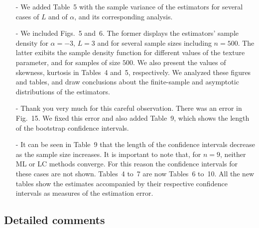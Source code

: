 \documentclass{ar2rc}
\begin{document}
	\begin{itemize}
		\item [-] We added Table~5 with the sample variance of the estimators for several cases of $L$ and of $\alpha$, and its corresponding analysis.
		
		\item [-] We included Figs.~5 and~6. 
		The former displays the estimators' sample density for $\alpha=-3$, $L=3$ and for several sample sizes including $n=500$. 
		The latter exibits the sample density function for different values of the texture parameter, and for samples of size $500$. 
		We also present the values of skewness, kurtosis in Tables~4 and~5, respectively. We analyzed these figures and tables, and draw conclusions about the finite-sample and asymptotic distributions of the estimators.
		
		\item [-] Thank you very much for this careful observation. There was an error in Fig.~15. We fixed this error and also added Table~9, which shows the length of the bootstrap confidence intervals.
		
		\item [-] It can be seen in Table~9 that the length of the confidence intervals decrease as the sample size increases. It is important to note that, for $n=9$, neither ML or LC methods converge. 
		For this reason the confidence intervals for these cases are not shown. Tables~4 to~7 are now Tables~6 to~10. 
		All the new tables show the estimates accompanied by their respective confidence intervals as measures of the estimation error. 
	\end{itemize}
	
	
	
	
	\subsection{Detailed comments}
	
	
\end{document}
